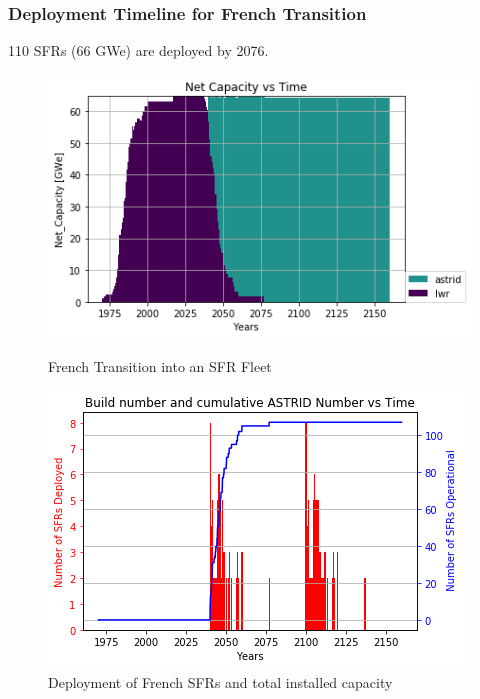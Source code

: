 \begin{frame}
\frametitle{Deployment Timeline for French Transition}
110 SFRs (66 GWe) are deployed by 2076.
\begin{figure}[htbp!]
\begin{minipage}[b]{.45\linewidth}
	\begin{center}
		\includegraphics[width=\textwidth]{./images/french-transition/power_plot.png}
	\end{center}
	\caption{French Transition into an SFR Fleet}
	\label{fig:sfr_num}
\end{minipage}
\hspace{.5cm}
\begin{minipage}[b]{.45\linewidth}
	\centering
	\includegraphics[width=\textwidth]{./images/french-transition/sfr_deploy.png}
	\caption{Deployment of French SFRs and total installed capacity}
	\label{fig:dep}
\end{minipage}
\end{figure}
\end{frame}



